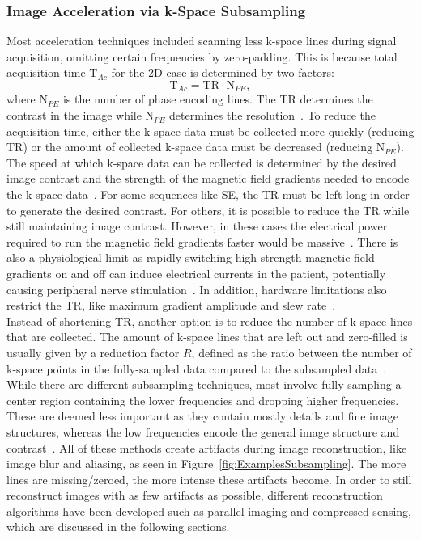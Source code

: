 \subsubsection{Image Acceleration via k-Space Subsampling} \label{SubSubSec:AccelerationSubsampling}
Most acceleration techniques included scanning less k-space lines during signal acquisition, omitting certain frequencies by zero-padding. This is because total acquisition time $\text{T}_{Ac}$ for the 2D case is determined by two factors:
\begin{equation}
	\text{T}_{Ac} = \text{TR} \cdot \text{N}_{PE},
\end{equation}
where $\text{N}_{PE}$ is the number of phase encoding lines. The TR determines the contrast in the image while $\text{N}_{PE}$ determines the resolution~\cite{ParallelMRI}. To reduce the acquisition time, either the k-space data must be collected more quickly (reducing TR) or the amount of collected k-space data must be decreased (reducing $\text{N}_{PE}$). The speed at which k-space data can be collected is determined by the desired image contrast and the strength of the magnetic field gradients needed to encode the k-space data~\cite{ParallelMRI}. For some sequences like SE, the TR must be left long in order to generate the desired contrast. For others, it is possible to reduce the TR while still maintaining image contrast. However, in these cases the electrical power required to run the magnetic field gradients faster would be massive~\cite{ParallelMRI}. There is also a physiological limit as rapidly switching high-strength magnetic field gradients on and off can induce electrical currents in the patient, potentially causing peripheral nerve stimulation~\cite{Cohen1990,Ham1997}. In addition, hardware limitations also restrict the TR, like maximum gradient amplitude and slew rate~\cite{AdvancesPI}. \\
Instead of shortening TR, another option is to reduce the number of k-space lines that are collected. The amount of k-space lines that are left out and zero-filled is usually given by a reduction factor $R$, defined as the ratio between the number of k-space points in the fully-sampled data compared to the subsampled data~\cite{AdvancesPI,ParallelMRI}. While there are different subsampling techniques, most involve fully sampling a center region containing the lower frequencies and dropping higher frequencies. These are deemed less important as they contain mostly details and fine image structures, whereas the low frequencies encode the general image structure and contrast~\cite{SamplingStrategies}. All of these methods create artifacts during image reconstruction, like image blur and aliasing, as seen in Figure~\ref{fig:ExamplesSubsampling}. The more lines are missing/zeroed, the more intense these artifacts become. In order to still reconstruct images with as few artifacts as possible, different reconstruction algorithms have been developed such as parallel imaging and compressed sensing, which are discussed in the following sections. \\
